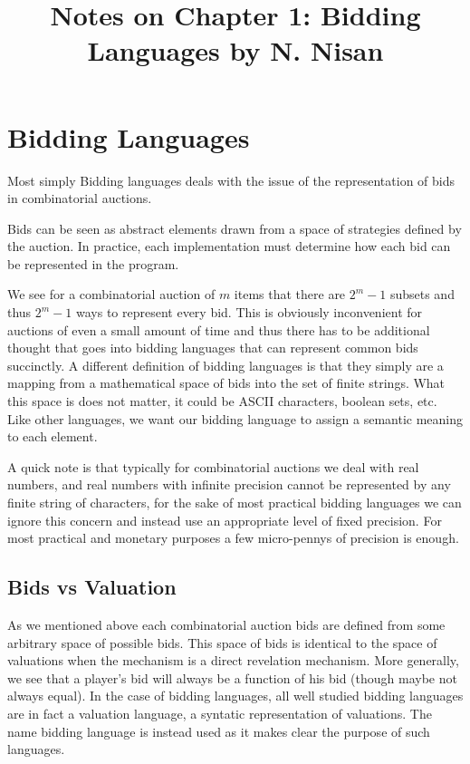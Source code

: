 \documentclass{article}
\begin{document}
\title{Notes on Chapter 1: Bidding Languages by N. Nisan}

\maketitle

\section{Bidding Languages}

Most simply Bidding languages deals with the issue of the representation of bids in combinatorial auctions. 

Bids can be seen as abstract elements drawn from a space of strategies defined by the auction.  In practice, each implementation must determine how each bid can be represented in the program. 

We see for a combinatorial auction of \(m\) items that there are  \(2^m -1\) subsets and thus \(2^m -1\) ways to represent every bid. This is obviously inconvenient for auctions of even a small amount of time and thus there has to be additional thought that goes into bidding languages that can represent common bids succinctly. 
A different definition of bidding languages is that they simply are a mapping from a mathematical space of bids into the set of finite strings. What this space is does not matter, it could be ASCII characters, boolean sets, etc. Like other languages, we want our bidding language to assign a semantic meaning to each element. 

A quick note is that typically for combinatorial auctions we deal with real numbers, and real numbers with infinite precision cannot be represented by any finite string of characters, for the sake of most practical bidding languages we can ignore this concern and instead use an appropriate level of fixed precision. For most practical and monetary purposes a few micro-pennys of precision is enough.

\subsection{Bids vs Valuation}

As we mentioned above each combinatorial auction bids are defined from some arbitrary space of possible bids. This space of bids is identical to the space of valuations when the mechanism is a direct revelation mechanism. More generally, we see that a player's bid will always be a function of his bid (though maybe not always equal). In the case of bidding languages, all well studied bidding languages are in fact a valuation language, a syntatic representation of valuations. The name bidding language is instead used as it makes clear the purpose of such languages. 
\end{document}
